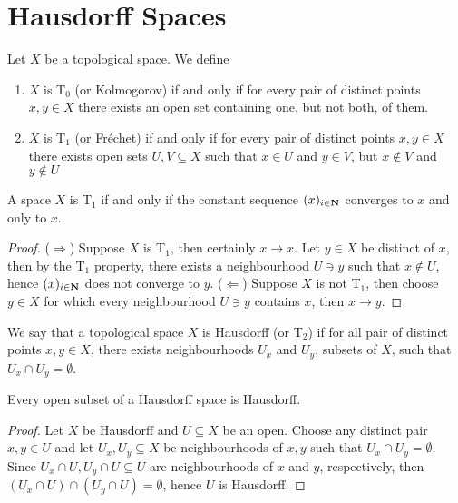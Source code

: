 \section{Hausdorff Spaces}

\begin{definition}
Let \(X\) be a topological space. We define
\begin{enumerate}[(1)]
\item\label{def:T0-space-kolmogorov} \(X\) is T\(_0\) (or Kolmogorov) if and
  only if for every pair of distinct points \(x, y \in X\) there exists an open
  set containing one, but not both, of them.
\item\label{def:T1-space-frechet} \(X\) is T\(_1\) (or Fréchet) if and only if
  for every pair of distinct points \(x, y \in X\) there exists open sets
  \(U, V \subseteq X\) such that \(x \in U\) and \(y \in V\), but
  \(x \not\in V\) and \(y \not\in U\)
\end{enumerate}
\end{definition}

\begin{proposition}
A space \(X\) is T\(_1\) if and only if the constant sequence \((x)_{i \in
\mathbf{N}}\) converges to \(x\) and only to \(x\).
\end{proposition}

\begin{proof}
(\(\Rightarrow\)) Suppose \(X\) is T\(_1\), then certainly \(x \to x\). Let
\(y \in X\) be distinct of \(x\), then by the T\(_1\) property, there exists a
neighbourhood \(U \ni y\) such that \(x \not\in U\), hence \((x)_{i \in
\mathbf{N}}\) does not converge to \(y\). (\(\Leftarrow\)) Suppose \(X\) is
not T\(_1\), then choose \(y \in X\) for which every neighbourhood \(U \ni y\)
contains \(x\), then \(x \to y\).
\end{proof}

\begin{definition}\label{def: Hausdorff space}
We say that a topological space \(X\) is Hausdorff (or T\(_2\)) if for all
pair of distinct points \(x, y \in X\), there exists neighbourhoods \(U_x\)
and \(U_y\), subsets of \(X\), such that \(U_x \cap U_y = \emptyset\).
\end{definition}

\begin{corollary}
Every open subset of a Hausdorff space is Hausdorff.
\end{corollary}

\begin{proof}
Let \(X\) be Hausdorff and \(U \subseteq X\) be an open. Choose any
distinct pair \(x, y \in U\) and let \(U_x, U_y \subseteq X\) be neighbourhoods
of \(x, y\) such that \(U_x \cap U_y = \emptyset\). Since \(U_x \cap U, U_y
\cap U \subseteq U\) are neighbourhoods of \(x\) and \(y\), respectively, then
\((U_x \cap U) \cap (U_y \cap U) = \emptyset\), hence \(U\) is Hausdorff.
\end{proof}


